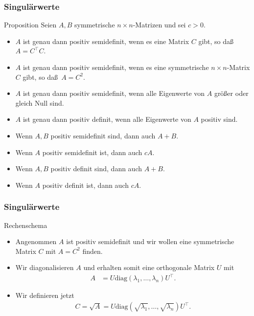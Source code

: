 \documentclass{beamer}
\newcommand{\diag}{\mathrm{diag}}
\newcommand{\trans}{\top}
\renewcommand{\ae}{\"a}
\renewcommand{\oe}{\"o}
\newcommand{\mytitle}{Singul\ae rwerte}
\begin{document}
\begin{frame}\frametitle{\mytitle}
	\begin{block}{Proposition}
		Seien $A,B$ symmetrische $n\times n$-Matrizen und sei $c>0$.
		\begin{itemize}
			\item $A$ ist genau dann positiv semidefinit, wenn es eine Matrix $C$ gibt, so da\ss\ $A=C^\trans C$.
			\item $A$ ist genau dann positiv semidefinit, wenn es eine symmetrische $n\times n$-Matrix $C$ gibt, so da\ss\ $A=C^2$.
			\item $A$ ist genau dann positiv semidefinit, wenn alle Eigenwerte von $A$ gr\oe\ss er oder gleich Null sind.
			\item $A$ ist genau dann positiv definit, wenn alle Eigenwerte von $A$ positiv sind.
			\item Wenn $A,B$ positiv semidefinit sind, dann auch $A+B$.
			\item Wenn $A$ positiv semidefinit ist, dann auch $cA$.
			\item Wenn $A,B$ positiv definit sind, dann auch $A+B$.
			\item Wenn $A$ positiv definit ist, dann auch $cA$.
		\end{itemize}
	\end{block}
\end{frame}

\begin{frame}\frametitle{\mytitle}
	\begin{block}{Rechenschema}
	\begin{itemize}
		\item Angenommen $A$ ist positiv semidefinit und wir wollen eine symmetrische Matrix $C$ mit $A=C^2$ finden.
		\item Wir diagonalisieren $A$ und erhalten somit eine orthogonale Matrix $U$ mit
			\begin{align*}
				A&=U\diag(\lambda_1,\ldots,\lambda_n)U^\trans.
			\end{align*}
		\item Wir definieren jetzt
			\begin{align*}
				C=\sqrt A=U\diag(\sqrt{\lambda_1},\ldots,\sqrt{\lambda_n})U^\trans.
			\end{align*}
	\end{itemize}
	\end{block}
\end{frame}
\end{document}
